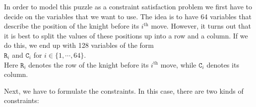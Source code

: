 In order to model this puzzle as a constraint satisfaction problem we first have to decide on the variables
that we want to use. The idea is to have 64 variables that describe the position of the knight before its
$i^{\mathrm{th}}$ move.  However, it turns out that it is best to split the values of these positions up into a
row and a column.  If we do this, we end up with 128 variables of the form
\\[0.2cm]
\hspace*{1.3cm}
$\mathtt{R}_i$ and $\mathtt{C}_i$ \quad for $i \in \{1,\cdots,64\}$.
\\[0.2cm]
Here $\mathtt{R}_i$ denotes the row of the knight before its $i^{\mathrm{th}}$ move, while $\mathtt{C}_i$
denotes its column.  

Next, we have to formulate the constraints.  In this case, there are two kinds of constraints:
